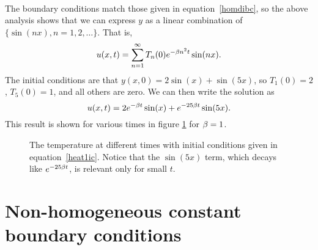\documentclass[10pt,driverfallback=hypertex]{report}
\newcounter{small}
\begin{document}
\\
{
  The boundary conditions match those given in equation~\eqref{homdibc}, so
  the above analysis shows that we can express $y$ as a linear combination
  of $\{\sin(nx),n=1,2,\dots\}$. That is,
  \begin{dmath*}
    u(x,t)=\sum_{n=1}^\infty T_n(0) e^{-\b n^2 t} \sin(nx).
  \end{dmath*}
  The initial conditions are that $y(x,0)=2\sin(x)+\sin(5x)$, so $T_1(0)=2$,
  $T_5(0)=1$, and all others are zero. We can then write the solution as
  \begin{dmath*}
    u(x,t) = 2 e^{-\b t} \sin(x) + e^{-25 \b t} \sin(5x).
  \end{dmath*}
 This result is shown for various times in figure \ref{heat1} for $\beta=1$.
  \begin{figure}[htbp]
    \begin{center}
      \caption{The temperature at different times with initial
        conditions given in equation~\eqref{heat1ic}. Notice that the
        $\sin(5x)$ term, which decays like $e^{-25 \beta t}$, is relevant
        only for small $t$. }
      \label{heat1}
    \end{center}
  \end{figure}
}


\section{Non-homogeneous constant boundary conditions}
\end{document}
